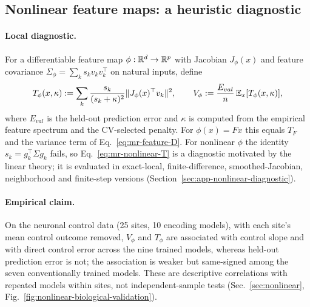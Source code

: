 

\subsection{Nonlinear feature maps: a heuristic diagnostic}
\label{sec:mr-nonlinear}

\paragraph{Local diagnostic.}
For a differentiable feature map $\phi:\mathbb{R}^d\to\mathbb{R}^p$ with Jacobian
$J_\phi(x)$ and feature covariance $\Sigma_\phi=\sum_ks_kv_kv_k^\top$ on
natural inputs, define
\begin{equation}
T_\phi(x,\kappa):=\sum_k\frac{s_k}{(s_k+\kappa)^2}\|J_\phi(x)^\top v_k\|^2,
\qquad
V_\phi:=\frac{E_{val}}{n}\,\mathbb{E}_x[T_\phi(x,\kappa)],
\label{eq:mr-nonlinear-T}
\end{equation}
where $E_{val}$ is the held-out prediction error and $\kappa$ is computed
from the empirical feature spectrum and the CV-selected penalty.  For
$\phi(x)=Fx$ this equals $T_F$ and the variance term of
Eq.~\ref{eq:mr-feature-D}.  For nonlinear $\phi$ the identity
$s_k=g_k^\top\Sigma g_k$ fails, so Eq.~\ref{eq:mr-nonlinear-T} is a
diagnostic motivated by the linear theory; it is evaluated in exact-local,
finite-difference, smoothed-Jacobian, neighborhood and finite-step versions
(Section~\ref{sec:app-nonlinear-diagnostic}).

\paragraph{Empirical claim.}
On the neuronal control data (25 sites, 10 encoding models), with each
site's mean control outcome removed, $V_\phi$ and $T_\phi$ are associated with
control slope and with direct control error across the nine trained models,
whereas held-out prediction error is not; the association is weaker but
same-signed among the seven conventionally trained models.  These are
descriptive correlations with repeated models within sites, not
independent-sample tests (Sec.~\ref{sec:nonlinear},
Fig.~\ref{fig:nonlinear-biological-validation}).
